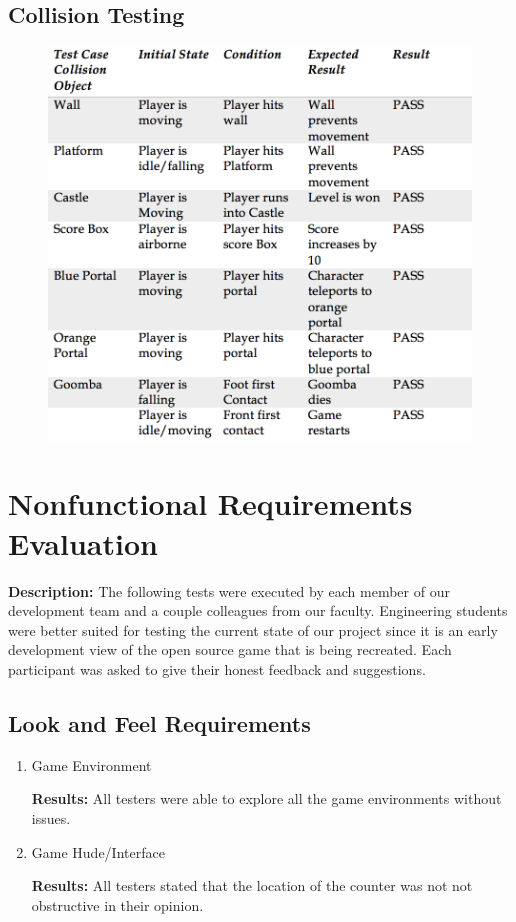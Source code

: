 \documentclass[12pt, titlepage]{article}
\begin{document}
\subsection{Collision Testing}

\begin{figure}[h]
   \centering
   \includegraphics[scale=0.85]{Table2.png} %
   \label{fig:table2}
\end{figure}



\section{Nonfunctional Requirements Evaluation}

\textbf{Description:}
The following tests were executed by each member of our development team and a couple colleagues from our faculty. Engineering students were better suited for testing the current state of our project since it is an early development view of the open source game that is being recreated. Each participant was asked to give their honest feedback and suggestions.

\subsection{Look and Feel Requirements}

\begin{enumerate}

\item{Game Environment\\}

\textbf{Results: }All testers were able to explore all the game environments without issues.
					
\item{Game Hude/Interface\\}

\textbf{Results: }All testers stated that the location of the counter was not not obstructive in their opinion.

\end{enumerate}
\end{document}
